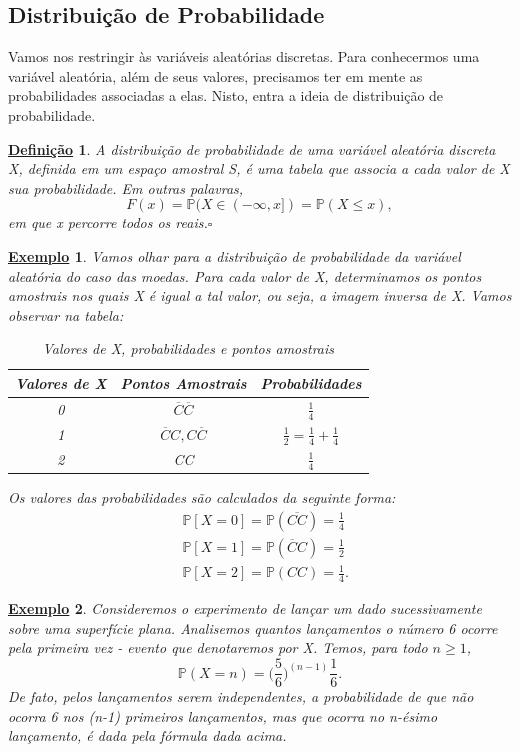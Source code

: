 \documentclass{article}
\newtheorem*{def*}{\underline{Defini\c c\~ao}}
\newtheorem{example}{\underline{Exemplo}}
\begin{document}
\subsection{Distribuição de Probabilidade}
  Vamos nos restringir às variáveis aleatórias discretas. Para conhecermos uma variável aleatória,
além de seus valores, precisamos ter em mente as probabilidades associadas a elas. Nisto, entra a ideia
de distribuição de probabilidade.
\begin{def*}
  A distribuição de probabilidade de uma variável aleatória discreta X, definida em um espaço amostral S,
é uma tabela que associa a cada valor de X sua probabilidade. Em outras palavras, 
  \[
    F(x) = \mathbb{P}(X\in (-\infty, x]) = \mathbb{P}(X\leq x),
  \]
  em que x percorre todos os reais.\(\square\)
\end{def*}
\begin{example}
  Vamos olhar para a distribuição de probabilidade da variável aleatória do caso das moedas.
Para cada valor de X, determinamos os pontos amostrais nos quais X é igual a tal valor, ou seja,
a imagem inversa de X. Vamos observar na tabela:
\begin{center}
  \begin{table}[h]
  \caption{Valores de X, probabilidades e pontos amostrais}

  \centering
    \begin{tabular}{| c | c | c |}
      \hline
      Valores de X & Pontos Amostrais & Probabilidades\\
      \hline
      0 & \(\overline{C}\overline{C}\) & \(\frac{1}{4}\)\\
      1 & \(\overline{C}C, C\overline{C}\) & \(\frac{1}{2} = \frac{1}{4} + \frac{1}{4}\)\\
      2 & CC & \(\frac{1}{4}\)\\
      \hline
    \end{tabular}
  \end{table}
\end{center}
  Os valores das probabilidades são calculados da seguinte forma:
 \begin{align*}
   &\mathbb{P}[X = 0] = \mathbb{P}(\overline{CC}) = \frac{1}{4}\\
   &\mathbb{P}[X = 1] = \mathbb{P}(\overline{C}C) = \frac{1}{2}\\
   &\mathbb{P}[X = 2] = \mathbb{P}(CC) = \frac{1}{4}.
 \end{align*}
\end{example}
\begin{example}
  Consideremos o experimento de lançar um dado sucessivamente sobre uma superfície plana. 
Analisemos quantos lançamentos o número 6 ocorre pela primeira vez - evento que denotaremos por X.
Temos, para todo \(n\geq 1\), 
  \[
    \mathbb{P}(X = n) = \biggl(\frac{5}{6}\biggr)^{(n-1)}\frac{1}{6}.
  \]
  De fato, pelos lançamentos serem independentes, a probabilidade de que não ocorra 6 nos
(n-1) primeiros lançamentos, mas que ocorra no n-ésimo lançamento, é dada pela fórmula dada acima.
\end{example}
\end{document}
